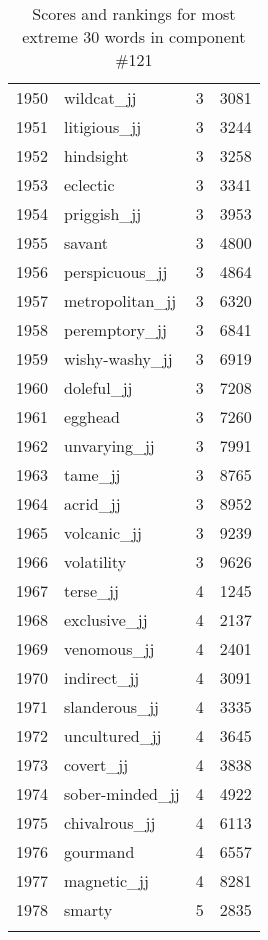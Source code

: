 \begin{longtable}[!htbp]{| rlr@{.}l |}
    1950 & wildcat\_jj & 3 & 3081 \\
    1951 & litigious\_jj & 3 & 3244 \\
    1952 & hindsight & 3 & 3258 \\
    1953 & eclectic & 3 & 3341 \\
    1954 & priggish\_jj & 3 & 3953 \\
    1955 & savant & 3 & 4800 \\
    1956 & perspicuous\_jj & 3 & 4864 \\
    1957 & metropolitan\_jj & 3 & 6320 \\
    1958 & peremptory\_jj & 3 & 6841 \\
    1959 & wishy-washy\_jj & 3 & 6919 \\
    1960 & doleful\_jj & 3 & 7208 \\
    1961 & egghead & 3 & 7260 \\
    1962 & unvarying\_jj & 3 & 7991 \\
    1963 & tame\_jj & 3 & 8765 \\
    1964 & acrid\_jj & 3 & 8952 \\
    1965 & volcanic\_jj & 3 & 9239 \\
    1966 & volatility & 3 & 9626 \\
    1967 & terse\_jj & 4 & 1245 \\
    1968 & exclusive\_jj & 4 & 2137 \\
    1969 & venomous\_jj & 4 & 2401 \\
    1970 & indirect\_jj & 4 & 3091 \\
    1971 & slanderous\_jj & 4 & 3335 \\
    1972 & uncultured\_jj & 4 & 3645 \\
    1973 & covert\_jj & 4 & 3838 \\
    1974 & sober-minded\_jj & 4 & 4922 \\
    1975 & chivalrous\_jj & 4 & 6113 \\
    1976 & gourmand & 4 & 6557 \\
    1977 & magnetic\_jj & 4 & 8281 \\
    1978 & smarty & 5 & 2835 \\
    \hline
    \caption{Scores and rankings for most extreme 30 words in component \#121} \\
\end{longtable}
